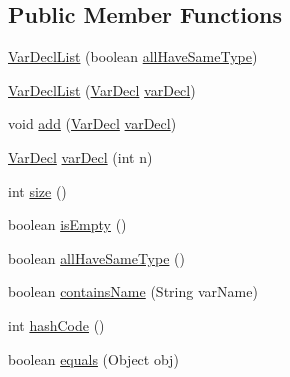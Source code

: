 \subsection*{Public Member Functions}
\begin{DoxyCompactItemize}
\item 
\hyperlink{classorg_1_1tzi_1_1use_1_1uml_1_1ocl_1_1expr_1_1_var_decl_list_ad035cda99bf7ce90724d0e544187502c}{Var\-Decl\-List} (boolean \hyperlink{classorg_1_1tzi_1_1use_1_1uml_1_1ocl_1_1expr_1_1_var_decl_list_a7a58cf5fc8dc092861ea940da51d872a}{all\-Have\-Same\-Type})
\item 
\hyperlink{classorg_1_1tzi_1_1use_1_1uml_1_1ocl_1_1expr_1_1_var_decl_list_a2e026cfc3968285bbda7d4a377514df0}{Var\-Decl\-List} (\hyperlink{classorg_1_1tzi_1_1use_1_1uml_1_1ocl_1_1expr_1_1_var_decl}{Var\-Decl} \hyperlink{classorg_1_1tzi_1_1use_1_1uml_1_1ocl_1_1expr_1_1_var_decl_list_a2b25a549d6e8d94b9ccdfd681ea83092}{var\-Decl})
\item 
void \hyperlink{classorg_1_1tzi_1_1use_1_1uml_1_1ocl_1_1expr_1_1_var_decl_list_ae9a6e150568bab0de6930451cac5e0c5}{add} (\hyperlink{classorg_1_1tzi_1_1use_1_1uml_1_1ocl_1_1expr_1_1_var_decl}{Var\-Decl} \hyperlink{classorg_1_1tzi_1_1use_1_1uml_1_1ocl_1_1expr_1_1_var_decl_list_a2b25a549d6e8d94b9ccdfd681ea83092}{var\-Decl})
\item 
\hyperlink{classorg_1_1tzi_1_1use_1_1uml_1_1ocl_1_1expr_1_1_var_decl}{Var\-Decl} \hyperlink{classorg_1_1tzi_1_1use_1_1uml_1_1ocl_1_1expr_1_1_var_decl_list_a2b25a549d6e8d94b9ccdfd681ea83092}{var\-Decl} (int n)
\item 
int \hyperlink{classorg_1_1tzi_1_1use_1_1uml_1_1ocl_1_1expr_1_1_var_decl_list_a025c47b63699b31b0636f5a4e61917b1}{size} ()
\item 
boolean \hyperlink{classorg_1_1tzi_1_1use_1_1uml_1_1ocl_1_1expr_1_1_var_decl_list_a34a35a712635238c5fb3cfff867fa380}{is\-Empty} ()
\item 
boolean \hyperlink{classorg_1_1tzi_1_1use_1_1uml_1_1ocl_1_1expr_1_1_var_decl_list_a7a58cf5fc8dc092861ea940da51d872a}{all\-Have\-Same\-Type} ()
\item 
boolean \hyperlink{classorg_1_1tzi_1_1use_1_1uml_1_1ocl_1_1expr_1_1_var_decl_list_a4e63099a00873913fc22e2bb105757fc}{contains\-Name} (String var\-Name)
\item 
int \hyperlink{classorg_1_1tzi_1_1use_1_1uml_1_1ocl_1_1expr_1_1_var_decl_list_a8611d725ccd8cfbc8a8e852a763ff5b7}{hash\-Code} ()
\item 
boolean \hyperlink{classorg_1_1tzi_1_1use_1_1uml_1_1ocl_1_1expr_1_1_var_decl_list_a3610272f9a95498abc60438f644f0593}{equals} (Object obj)

\end{DoxyCompactItemize}
